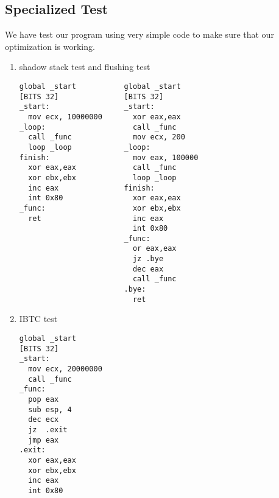 \documentclass{article}
\begin{document}
\subsection{Specialized Test}
We have test our program using very simple code to make sure that our optimization is working.
\begin{enumerate}
\item shadow stack test and flushing test
\begin{verbatim}
global _start           global _start
[BITS 32]               [BITS 32]
_start:                 _start:
  mov ecx, 10000000       xor eax,eax
_loop:                    call _func
  call _func              mov ecx, 200
  loop _loop            _loop:
finish:                   mov eax, 100000
  xor eax,eax             call _func
  xor ebx,ebx             loop _loop
  inc eax               finish:
  int 0x80                xor eax,eax
_func:                    xor ebx,ebx
  ret                     inc eax
                          int 0x80
                        _func:
                          or eax,eax
                          jz .bye
                          dec eax
                          call _func
                        .bye:
                          ret\end{verbatim}
\item IBTC test
\begin{verbatim}
global _start
[BITS 32]
_start:
  mov ecx, 20000000
  call _func
_func:
  pop eax
  sub esp, 4
  dec ecx
  jz  .exit
  jmp eax
.exit:
  xor eax,eax
  xor ebx,ebx
  inc eax
  int 0x80
\end{verbatim}
\end{enumerate}
\end{document}

